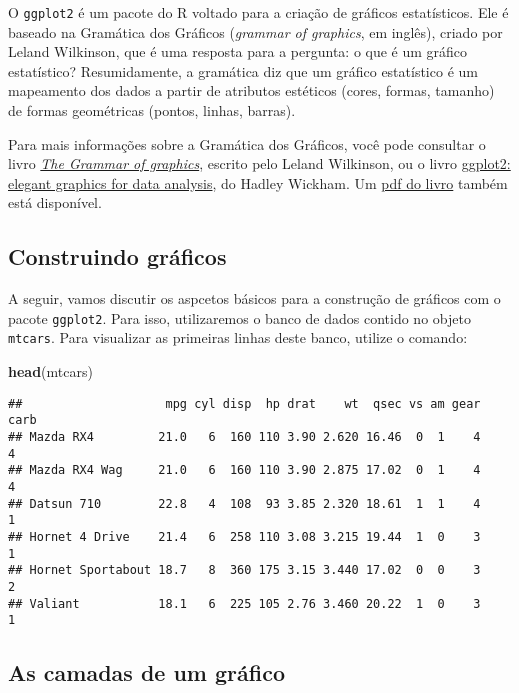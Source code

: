 \documentclass[]{book}
\newenvironment{Shaded}{\begin{snugshade}}{\end{snugshade}}
\newcommand{\KeywordTok}[1]{\textcolor[rgb]{0.13,0.29,0.53}{\textbf{{#1}}}}
\newcommand{\NormalTok}[1]{{#1}}
\begin{document}
O \texttt{ggplot2} é um pacote do R voltado para a criação de gráficos
estatísticos. Ele é baseado na Gramática dos Gráficos (\emph{grammar of
graphics}, em inglês), criado por Leland Wilkinson, que é uma resposta
para a pergunta: o que é um gráfico estatístico? Resumidamente, a
gramática diz que um gráfico estatístico é um mapeamento dos dados a
partir de atributos estéticos (cores, formas, tamanho) de formas
geométricas (pontos, linhas, barras).

Para mais informações sobre a Gramática dos Gráficos, você pode
consultar o livro
\href{http://www.springer.com/statistics/computational+statistics/book/978-0-387-24544-7}{\emph{The
Grammar of graphics}}, escrito pelo Leland Wilkinson, ou o livro
\href{http://ggplot2.org/book/}{ggplot2: elegant graphics for data
analysis}, do Hadley Wickham. Um
\href{http://moderngraphics11.pbworks.com/f/ggplot2-Book09hWickham.pdf}{pdf
do livro} também está disponível.

\subsection{Construindo gráficos}\label{construindo-graficos}

A seguir, vamos discutir os aspcetos básicos para a construção de
gráficos com o pacote \texttt{ggplot2}. Para isso, utilizaremos o banco
de dados contido no objeto \texttt{mtcars}. Para visualizar as primeiras
linhas deste banco, utilize o comando:

\begin{Shaded}
\begin{Highlighting}[]
\KeywordTok{head}\NormalTok{(mtcars)}
\end{Highlighting}
\end{Shaded}

\begin{verbatim}
##                    mpg cyl disp  hp drat    wt  qsec vs am gear carb
## Mazda RX4         21.0   6  160 110 3.90 2.620 16.46  0  1    4    4
## Mazda RX4 Wag     21.0   6  160 110 3.90 2.875 17.02  0  1    4    4
## Datsun 710        22.8   4  108  93 3.85 2.320 18.61  1  1    4    1
## Hornet 4 Drive    21.4   6  258 110 3.08 3.215 19.44  1  0    3    1
## Hornet Sportabout 18.7   8  360 175 3.15 3.440 17.02  0  0    3    2
## Valiant           18.1   6  225 105 2.76 3.460 20.22  1  0    3    1
\end{verbatim}

\subsection{As camadas de um gráfico}\label{as-camadas-de-um-grafico}
\end{document}

